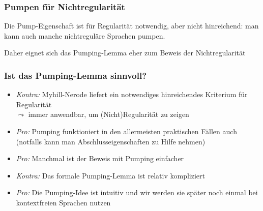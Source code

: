 \documentclass[aspectratio=1610,onlymath]{beamer}
\begin{document}
\begin{frame}[t]\frametitle{Pumpen für Nichtregularität}

Die Pump-Eigenschaft ist für Regularität \alert{notwendig}, aber \alert{nicht hinreichend}: man kann auch manche nichtreguläre Sprachen pumpen.
\medskip

Daher eignet sich das Pumping-Lemma eher zum Beweis der Nichtregularität
\medskip\pause


\end{frame}


\begin{frame}\frametitle{Ist das Pumping-Lemma sinnvoll?}

\begin{itemize}
\item \emph{Kontra:} Myhill-Nerode liefert ein notwendiges  hinreichendes Kriterium für Regularität\\
$\leadsto$ immer anwendbar, um (Nicht)Regularität zu zeigen
\item \emph{Pro:} Pumping funktioniert in den allermeisten praktischen Fällen auch\\
(notfalls kann man Abschlusseigenschaften zu Hilfe nehmen)
\item \emph{Pro:} Manchmal ist der Beweis mit Pumping einfacher
\item \emph{Kontra:} Das formale Pumping-Lemma ist relativ kompliziert
\item \emph{Pro:} Die Pumping-Idee ist intuitiv und wir werden sie später noch einmal bei kontextfreien Sprachen nutzen
\end{itemize}

\end{frame}


\end{document}
